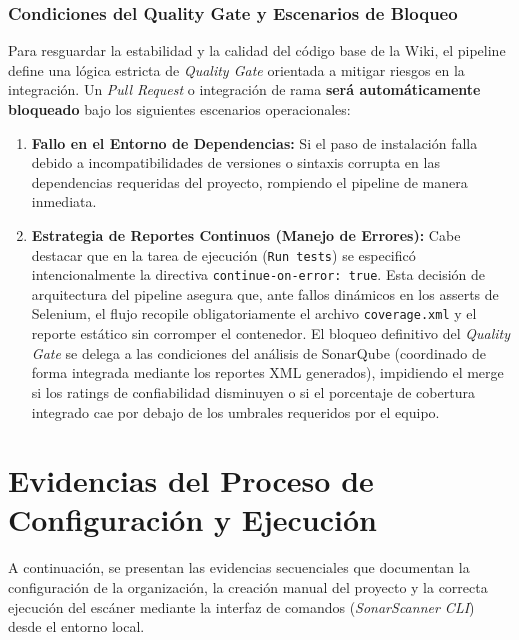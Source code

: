 \documentclass[12pt]{article}
\begin{document}
\subsubsection{Condiciones del Quality Gate y Escenarios de Bloqueo}
Para resguardar la estabilidad y la calidad del código base de la Wiki, el pipeline define una lógica estricta de \textit{Quality Gate} orientada a mitigar riesgos en la integración. Un \textit{Pull Request} o integración de rama \textbf{será automáticamente bloqueado} bajo los siguientes escenarios operacionales:
\begin{enumerate}
    \item \textbf{Fallo en el Entorno de Dependencias:} Si el paso de instalación falla debido a incompatibilidades de versiones o sintaxis corrupta en las dependencias requeridas del proyecto, rompiendo el pipeline de manera inmediata.
    \item \textbf{Estrategia de Reportes Continuos (Manejo de Errores):} Cabe destacar que en la tarea de ejecución (\texttt{Run tests}) se especificó intencionalmente la directiva \texttt{continue-on-error: true}. Esta decisión de arquitectura del pipeline asegura que, ante fallos dinámicos en los asserts de Selenium, el flujo recopile obligatoriamente el archivo \texttt{coverage.xml} y el reporte estático sin corromper el contenedor. El bloqueo definitivo del \textit{Quality Gate} se delega a las condiciones del análisis de SonarQube (coordinado de forma integrada mediante los reportes XML generados), impidiendo el merge si los ratings de confiabilidad disminuyen o si el porcentaje de cobertura integrado cae por debajo de los umbrales requeridos por el equipo.
\end{enumerate}

\newpage



\section{Evidencias del Proceso de Configuración y Ejecución}
A continuación, se presentan las evidencias secuenciales que documentan la configuración de la organización, la creación manual del proyecto y la correcta ejecución del escáner mediante la interfaz de comandos (\textit{SonarScanner CLI}) desde el entorno local.
\end{document}
